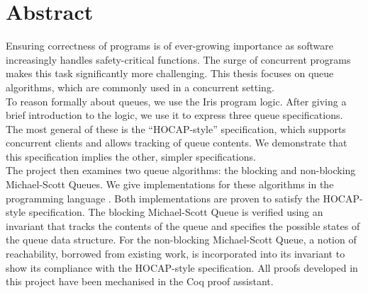 \documentclass[a4paper, 10pt]{report}
\theoremstyle{definition}
\begin{document}

\pagestyle{empty}
\vspace*{\fill}
\clearpage


\pagestyle{plain}


\chapter*{Abstract}

Ensuring correctness of programs is of ever-growing importance as software increasingly handles safety-critical functions. The surge of concurrent programs makes this task significantly more challenging. This thesis focuses on queue algorithms, which are commonly used in a concurrent setting.\\
To reason formally about queues, we use the Iris program logic. After giving a brief introduction to the logic, we use it to express three queue specifications. The most general of these is the ``HOCAP-style'' specification, which supports concurrent clients and allows tracking of queue contents. We demonstrate that this specification implies the other, simpler specifications.\\
The project then examines two queue algorithms: the blocking and non-blocking Michael-Scott Queues. We give implementations for these algorithms in the programming language \heaplang{}. Both implementations are proven to satisfy the HOCAP-style specification. The blocking Michael-Scott Queue is verified using an invariant that tracks the contents of the queue and specifies the possible states of the queue data structure. For the non-blocking Michael-Scott Queue, a notion of reachability, borrowed from existing work, is incorporated into its invariant to show its compliance with the HOCAP-style specification. All proofs developed in this project have been mechanised in the Coq proof assistant.
\end{document}
